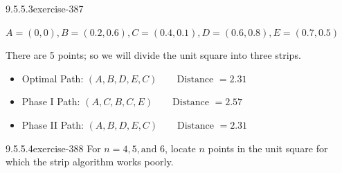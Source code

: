 \documentclass[twoside,10pt,]{book}
\numberwithin{equation}{section}
\begin{document}
\begin{divisionsolution}{9.5.5.3}{}{exercise-387}
\begin{enumerate}[label=(\alph*)]
\(A=(0,0), B=(0.2,0.6), C=(0.4,0.1), D=(0.6,0.8), E=(0.7,0.5)\)%
\par
\hypertarget{p-3392}{}%
There are 5 points; so we will divide the unit square into three strips.%
\begin{itemize}[label=\textbullet]
\item{}\hypertarget{p-3393}{}%
Optimal Path: \((A,B,D,E,C)\quad \quad \text{Distance }=2.31\)%
\item{}\hypertarget{p-3394}{}%
Phase I Path: \((A,C,B,C,E)\quad \quad \text{Distance }= 2.57\)%
\item{}\hypertarget{p-3395}{}%
Phase II Path: \((A,B,D,E,C) \quad \quad\textrm{Distance }=2.31\)%
\end{itemize}
%
\end{enumerate}
%
\end{divisionsolution}%
\begin{divisionsolution}{9.5.5.4}{}{exercise-388}%
\hypertarget{p-3396}{}%
For \(n = 4, 5, \text{and } 6\), locate \(n\) points in the unit square for which the strip algorithm works poorly.%
\end{divisionsolution}%
\end{document}
